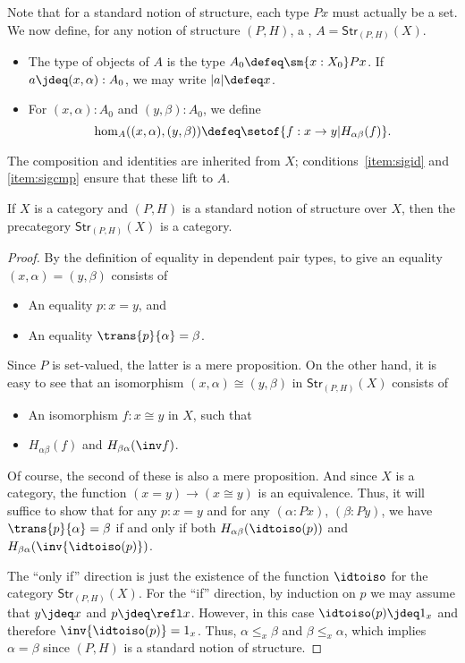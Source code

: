 Note that for a standard notion of structure, each type $Px$ must actually be a set.
We now define, for any notion of structure $(P,H)$, a ,
%
%
$A = \mathsf{Str}_{(P,H)}(X)$.
\begin{itemize}
\item The type of objects of $A$ is the type $A_0 \defeq \sm{x:X_0} Px$.
  If $a\jdeq (x,\alpha):A_0$, we may write $|a| \defeq x$.
\item For $(x,\alpha):A_0$ and $(y,\beta):A_0$, we define
  \[\hom_A((x,\alpha),(y,\beta)) \defeq \setof{ f:x \to y | H_{\alpha\beta}(f)}.\]
\end{itemize}
The composition and identities are inherited from $X$; conditions~\ref{item:sigid} and \ref{item:sigcmp} ensure that these lift to $A$.

\begin{thm}\label{thm:sip}
  If $X$ is a category and $(P,H)$ is a standard notion of structure over $X$, then the precategory $\mathsf{Str}_{(P,H)}(X)$ is a category.
\end{thm}
\begin{proof}
  By the definition of equality in dependent pair types, to give an equality $(x,\alpha)=(y,\beta)$ consists of
  \begin{itemize}
  \item An equality $p:x=y$, and
  \item An equality $\trans{p}{\alpha}=\beta$.
  \end{itemize}
  Since $P$ is set-valued, the latter is a mere proposition.
  On the other hand, it is easy to see that an isomorphism $(x,\alpha)\cong (y,\beta)$ in $\mathsf{Str}_{(P,H)}(X)$ consists of
  \begin{itemize}
  \item An isomorphism $f:x\cong y$ in $X$, such that
  \item $H_{\alpha\beta}(f)$ and $H_{\beta\alpha}(\inv f)$.
  \end{itemize}
  Of course, the second of these is also a mere proposition.
  And since $X$ is a category, the function $(x=y) \to (x\cong y)$ is an equivalence.
  Thus, it will suffice to show that for any $p:x=y$ and for any $(\alpha:Px)$, $(\beta:Py)$, we have $\trans{p}{\alpha}=\beta$ if and only if both  $H_{\alpha\beta}(\idtoiso (p))$ and $H_{\beta\alpha}(\inv{\idtoiso(p)})$.

  The ``only if'' direction is just the existence of the function $\idtoiso$ for the category $\mathsf{Str}_{(P,H)}(X)$.
  For the ``if'' direction, by induction on $p$ we may assume that $y\jdeq x$ and $p\jdeq\refl x$.
  However, in this case $\idtoiso (p)\jdeq 1_x$ and therefore $\inv{\idtoiso(p)}=1_x$.
  Thus, $\alpha\leq_x \beta$ and $\beta\leq_x \alpha$, which implies $\alpha=\beta$ since $(P,H)$ is a standard notion of structure.
\end{proof}

